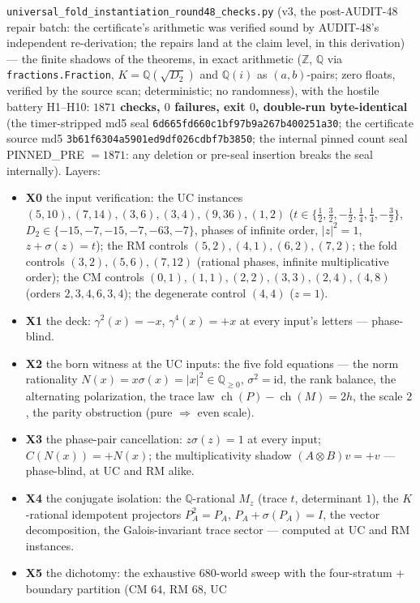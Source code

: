 \documentclass[11pt]{article}
\newcommand{\ch}{\operatorname{ch}}
\newcommand{\Z}{\mathbb Z}
\newcommand{\Q}{\mathbb Q}
\begin{document}
\texttt{universal\_fold\_instantiation\_round48\_checks.py} (v3, the
post-AUDIT-48 repair batch: the certificate's arithmetic was verified
sound by AUDIT-48's independent re-derivation; the repairs land at
the claim level, in this derivation) --- the finite shadows of the
theorems, in exact arithmetic ($\Z$, $\Q$ via
\texttt{fractions.Fraction}, $K=\Q(\sqrt{D_2})$ and $\Q(i)$ as
$(a,b)$-pairs; zero floats, verified by the source scan;
deterministic; no randomness), with the hostile battery H1--H10:
\textbf{$1871$ checks, $0$ failures, exit $0$, double-run
byte-identical} (the timer-stripped md5 seal
\texttt{6d665fd660c1bf97b9a267b400251a30}; the certificate source
md5 \texttt{3b61f6304a5901ed9df026cdbf7b3850}; the internal pinned
count seal PINNED\_PRE $=1871$: any deletion or pre-seal insertion
breaks the seal internally). Layers:
\begin{itemize}
\item \textbf{X0} the input verification: the UC instances
$(5,10),(7,14),(3,6),(3,4),(9,36),(1,2)$ ($t\in\{\tfrac12,
\tfrac32,-\tfrac12,\tfrac14,\tfrac14,-\tfrac32\}$, $D_2\in
\{-15,-7,-15,-7,-63,-7\}$, phases of infinite order, $|z|^2=1$,
$z+\sigma(z)=t$); the RM controls $(5,2),(4,1),(6,2),(7,2)$; the
fold controls $(3,2),(5,6),(7,12)$ (rational phases, infinite
multiplicative order); the CM controls
$(0,1),(1,1),(2,2),(3,3),(2,4),(4,8)$ (orders $2,3,4,6,3,4$); the
degenerate control $(4,4)$ ($z=1$).
\item \textbf{X1} the deck: $\gamma^2(x)=-x$, $\gamma^4(x)=+x$ at
every input's letters --- phase-blind.
\item \textbf{X2} the born witness at the UC inputs: the five fold
equations --- the norm rationality $N(x)=x\sigma(x)=|x|^2\in\Q_{\ge0}$,
$\sigma^2=\mathrm{id}$, the rank balance, the alternating
polarization, the trace law $\ch(P)-\ch(M)=2h$, the scale $2$, the
parity obstruction (pure $\Rightarrow$ even scale).
\item \textbf{X3} the phase-pair cancellation: $z\sigma(z)=1$ at
every input; $C(N(x))=+N(x)$; the multiplicativity shadow
$(A\otimes B)v=+v$ --- phase-blind, at UC and RM alike.
\item \textbf{X4} the conjugate isolation: the $\Q$-rational $M_z$
(trace $t$, determinant $1$), the $K$-rational idempotent projectors
$P_A^2=P_A$, $P_A+\sigma(P_A)=I$, the vector decomposition, the
Galois-invariant trace sector --- computed at UC and RM instances.
\item \textbf{X5} the dichotomy: the exhaustive $680$-world sweep
with the four-stratum $+$ boundary partition (CM $64$, RM $68$, UC

\end{itemize}
\end{document}
